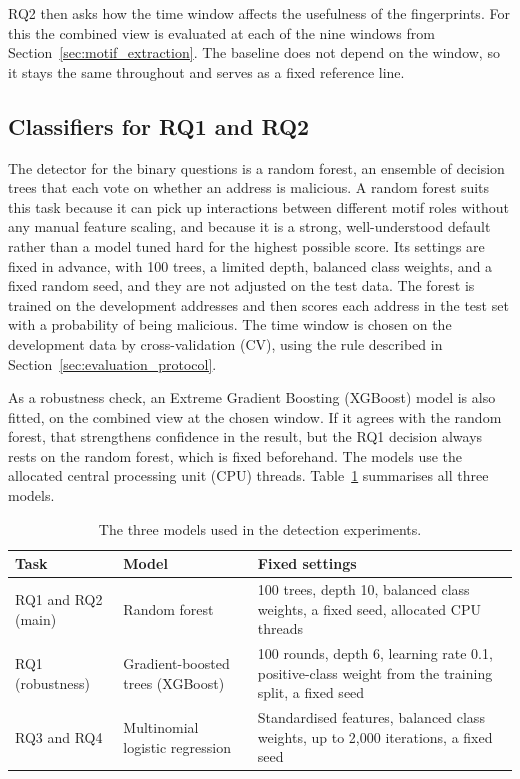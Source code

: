 \documentclass{thesisclass}
\begin{document}
RQ2 then asks how the time window affects the usefulness of the fingerprints.
For this the
combined view is evaluated at each of the nine windows from
Section~\ref{sec:motif_extraction}. The baseline does not depend on the window, so
it stays the same throughout and serves as a fixed reference line.

\subsection{Classifiers for RQ1 and RQ2}

The detector for the binary questions is a random forest, an ensemble of decision
trees that each vote on whether an address is malicious. A random forest suits
this task because it can pick up interactions between different motif roles
without any manual feature scaling, and because it is a strong, well-understood
default rather than a model tuned hard for the highest possible score. Its
settings are fixed in advance, with 100 trees, a limited depth, balanced class
weights, and a fixed random seed, and they are not adjusted on the test data. The
forest is trained on the development addresses and then scores each address in the
test set with a probability of being malicious. The time window is chosen on the
development data by cross-validation (CV), using the rule described in
Section~\ref{sec:evaluation_protocol}.

As a robustness check, an Extreme Gradient Boosting (XGBoost) model is also fitted, on
the combined view at the chosen window. If it agrees with the random forest, that
strengthens confidence in the result, but the RQ1 decision always rests on the
random forest, which is fixed beforehand. The models use the allocated central
processing unit (CPU) threads. Table~\ref{tab:results_models}
summarises all three models.

\begin{table}[ht]
\centering
\caption{The three models used in the detection experiments.}
\label{tab:results_models}
\small
\begin{tabular}{@{}p{2.8cm} p{3.7cm} p{6.6cm}@{}}
\toprule
\textbf{Task} & \textbf{Model} & \textbf{Fixed settings} \\
\midrule
RQ1 and RQ2 (main) &
Random forest &
100 trees, depth 10, balanced class weights, a fixed seed, allocated CPU threads \\[2pt]
RQ1 (robustness) &
Gradient-boosted trees (XGBoost) &
100 rounds, depth 6, learning rate 0.1, positive-class weight from the training
split, a fixed seed \\[2pt]
RQ3 and RQ4 &
Multinomial logistic regression &
Standardised features, balanced class weights, up to 2{,}000 iterations, a fixed
seed \\
\bottomrule
\end{tabular}
\end{table}
\end{document}

